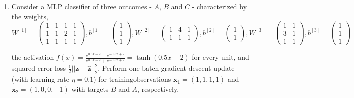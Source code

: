 \documentclass[12pt]{article}
\begin{document}
\begin{enumerate}[leftmargin=\labelsep]
    \item Consider a MLP classifier of three outcomes - $A$, $B$ and $C$ - characterized by the weights,
    \begin{equation}
        W^{[1]}=\begin{pmatrix}
            1 & 1 & 1 & 1 \\
            1 & 1 & 2 & 1 \\
            1 & 1 & 1 & 1
        \end{pmatrix}, b^{[1]} = \begin{pmatrix}
            1 \\
            1 \\
            1
        \end{pmatrix}, W^{[2]} = \begin{pmatrix}
            1 & 4 & 1 \\
            1 & 1 & 1
        \end{pmatrix}, b^{[2]} = \begin{pmatrix}
            1 \\
            1
        \end{pmatrix}, W^{[3]} = \begin{pmatrix}
            1 & 1 \\
            3 & 1 \\
            1 & 1
        \end{pmatrix}, b^{[3]} = \begin{pmatrix}
            1 \\
            1 \\
            1
        \end{pmatrix}
    \end{equation}

    the activation $f(x) = \frac{e^{0.5x-2}-e^{-0.5x+2}}{e^{0.5x-2}+e^{-0.5x+2}} = \tanh(0.5x-2)$ for every unit, and squared error loss $\frac{1}{2}||\mathbf{z}-\hat{\mathbf{z}}||^2_2$. Perform one batch gradient descent update (with learning rate $\eta = 0.1$) for trainingobservations $\mathbf{x}_1 = (1, 1, 1, 1)$ and $\mathbf{x}_2 = (1, 0, 0, -1)$ with targets $B$ and $A$, respectively.


\end{enumerate}
\end{document}
